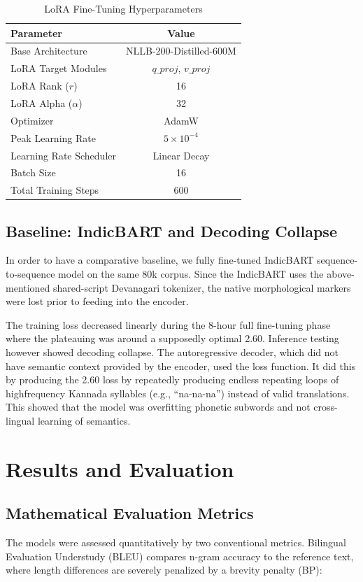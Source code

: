 \documentclass[conference]{IEEEtran}
\begin{document}
\begin{table}[h]
\caption{LoRA Fine-Tuning Hyperparameters}
\label{tab:hyperparams}
\centering
\begin{tabular}{@{}lc@{}}
\toprule
\textbf{Parameter} & \textbf{Value} \\ 
\midrule
Base Architecture & NLLB-200-Distilled-600M \\
LoRA Target Modules & $q\_proj$, $v\_proj$ \\
LoRA Rank ($r$) & 16 \\
LoRA Alpha ($\alpha$) & 32 \\
Optimizer & AdamW \\
Peak Learning Rate & $5 \times 10^{-4}$ \\
Learning Rate Scheduler & Linear Decay \\
Batch Size & 16 \\
Total Training Steps & 600 \\
\bottomrule
\end{tabular}
\end{table}

\subsection{Baseline: IndicBART and Decoding Collapse}
In order to have a comparative baseline, we fully fine-tuned IndicBART sequence-to-sequence model on the same 80k corpus. Since the IndicBART uses the above-mentioned shared-script Devanagari tokenizer, the native morphological markers were lost prior to feeding into the encoder.

The training loss decreased linearly during the 8-hour full fine-tuning phase where the plateauing was around a supposedly optimal 2.60. Inference testing however showed decoding collapse. The autoregressive decoder, which did not have semantic context provided by the encoder, used the loss function. It did this by producing the 2.60 loss by repeatedly producing endless repeating loops of highfrequency Kannada syllables (e.g., “na-na-na”) instead of valid translations. This showed that the model was overfitting phonetic subwords and not cross-lingual learning of semantics.

\section{Results and Evaluation}

\subsection{Mathematical Evaluation Metrics}
The models were assessed quantitatively by two conventional metrics. Bilingual Evaluation Understudy (BLEU) compares n-gram accuracy to the reference text, where length differences are severely penalized by a brevity penalty (BP):
\end{document}
